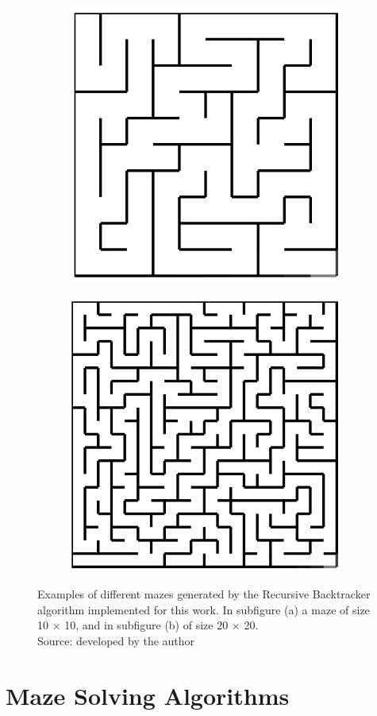 \begin{figure}[!h]
    \centering
    \begin{subfigure}{.45\textwidth}
    \centering
    \includegraphics[width=.6\linewidth]{recursive1010.png}
    \caption{}
    \label{fig:sub1}
    \end{subfigure}
    \begin{subfigure}{.45\textwidth}
    \centering
    \includegraphics[width=.6\linewidth]{recursive2020.png}
    \caption{}
    \label{fig:sub2}
    \end{subfigure}
    \caption{Examples of different mazes generated by the Recursive Backtracker algorithm implemented for this work. In subfigure (a) a maze of size 10 $\times$ 10, and in subfigure (b) of size 20 $\times$ 20.\\ Source: developed by the author}
    \label{fig:test}
    \end{figure}
\section{Maze Solving Algorithms}
